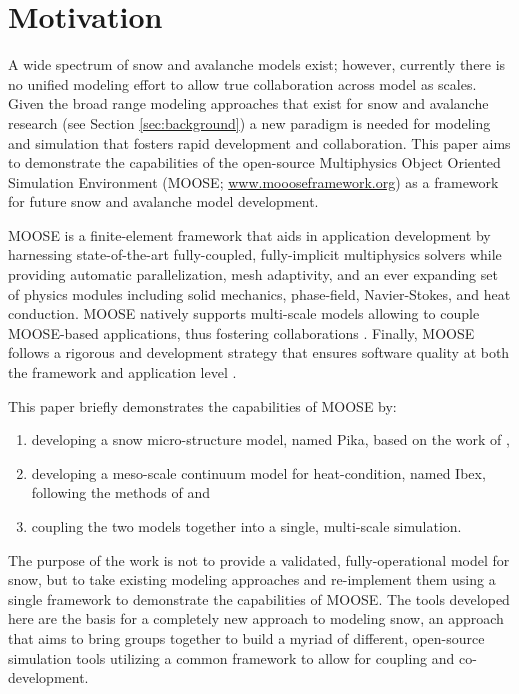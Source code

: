 \section{Motivation}\label{sec:motivation}
A wide spectrum of snow and avalanche models exist; however, currently there is no unified modeling effort to allow true collaboration across model as scales. Given the broad range modeling approaches that exist for snow and avalanche research (see Section \ref{sec:background}) a new paradigm is needed for modeling and simulation that fosters rapid development and collaboration. This paper aims to demonstrate the capabilities of the open-source Multiphysics Object Oriented Simulation Environment (MOOSE; \url{www.moooseframework.org}) as a framework for future snow and avalanche model development.

MOOSE is a finite-element framework that aids in application development by harnessing state-of-the-art fully-coupled, fully-implicit multiphysics solvers while providing automatic parallelization, mesh adaptivity, and an ever expanding set of physics modules including solid mechanics, phase-field, Navier-Stokes, and heat conduction. MOOSE natively supports multi-scale models allowing to couple MOOSE-based applications, thus fostering collaborations \citep{gaston2014physics}. Finally, MOOSE follows a rigorous and development strategy that ensures software quality at both the framework and application level \citep{gaston2014continous}.

This paper briefly demonstrates the capabilities of MOOSE by:
\begin{enumerate}\setlength{\itemsep}{0pt}
\item developing a snow micro-structure model, named Pika, based on the work of \citet{kaempfer2009phase},
\item developing a meso-scale continuum model for heat-condition, named Ibex, following the methods of \citet{slaughter2010numerical} and
\item coupling the two models together into a single, multi-scale simulation.
\end{enumerate}

The purpose of the work is not to provide a validated, fully-operational model for snow, but to take existing modeling approaches and re-implement them using a single framework to demonstrate the capabilities of MOOSE. The tools developed here are the basis for a completely new approach to modeling snow, an approach that aims to bring groups together to build a myriad of different, open-source simulation tools utilizing a common framework to allow for coupling and co-development.

